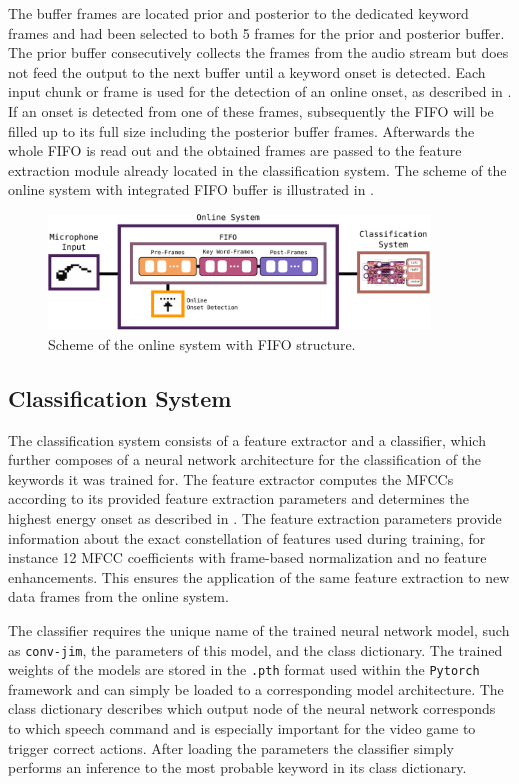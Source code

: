 The buffer frames are located prior and posterior to the dedicated keyword frames and had been selected to both 5 frames for the prior and posterior buffer.
The prior buffer consecutively collects the frames from the audio stream but does not feed the output to the next buffer until a keyword onset is detected. 
Each input chunk or frame is used for the detection of an online onset, as described in .
If an onset is detected from one of these frames, subsequently the FIFO will be filled up to its full size including the posterior buffer frames.
Afterwards the whole FIFO is read out and the obtained frames are passed to the feature extraction module already located in the classification system.
The scheme of the online system with integrated FIFO buffer is illustrated in .
\begin{figure}[!ht]
  \centering
  \includegraphics[width=0.9\textwidth]{./6_game/figs/game_system_online.pdf}
  \caption{Scheme of the online system with FIFO structure.}
  \label{fig:game_system_online}
\end{figure}
\FloatBarrier
\noindent



\subsection{Classification System}
The classification system consists of a feature extractor and a classifier, which further composes of a neural network architecture for the classification of the keywords it was trained for.
The feature extractor computes the MFCCs according to its provided feature extraction parameters and determines the highest energy onset as described in .
The feature extraction parameters provide information about the exact constellation of features used during training, for instance 12 MFCC coefficients with frame-based normalization and no feature enhancements.
This ensures the application of the same feature extraction to new data frames from the online system.

The classifier requires the unique name of the trained neural network model, such as \texttt{conv-jim}, the parameters of this model, and the class dictionary.
The trained weights of the  models are stored in the \texttt{.pth} format used within the \texttt{Pytorch} framework and can simply be loaded to a corresponding model architecture.
The class dictionary describes which output node of the neural network corresponds to which speech command and is especially important for the video game to trigger correct actions.
After loading the parameters the classifier simply performs an inference to the most probable keyword in its class dictionary.

